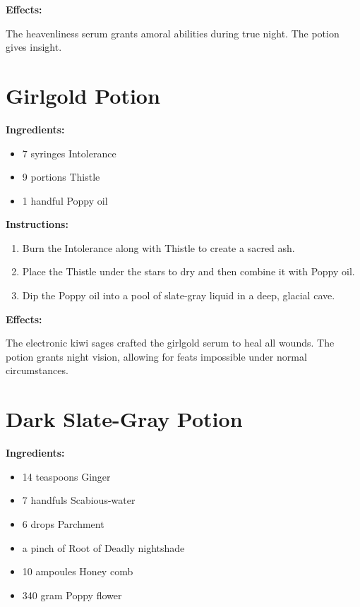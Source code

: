 \documentclass{article}
\begin{document}
\textbf{Effects:}

The heavenliness serum grants amoral abilities during true night. The potion gives insight.

\newpage
\section*{Girlgold Potion}

\textbf{Ingredients:}

\begin{itemize}
  \item 7 syringes Intolerance
  \item 9 portions Thistle
  \item 1 handful Poppy oil
\end{itemize}

\textbf{Instructions:}

\begin{enumerate}
  \item Burn the Intolerance along with Thistle to create a sacred ash.
  \item Place the Thistle under the stars to dry and then combine it with Poppy oil.
  \item Dip the Poppy oil into a pool of slate-gray liquid in a deep, glacial cave.
\end{enumerate}

\textbf{Effects:}

The electronic kiwi sages crafted the girlgold serum to heal all wounds. The potion grants night vision, allowing for feats impossible under normal circumstances.

\newpage
\section*{Dark Slate-Gray Potion}

\textbf{Ingredients:}

\begin{itemize}
  \item 14 teaspoons Ginger
  \item 7 handfuls Scabious-water
  \item 6 drops Parchment
  \item a pinch of Root of Deadly nightshade
  \item 10 ampoules Honey comb
  \item 340 gram Poppy flower
\end{itemize}
\end{document}
